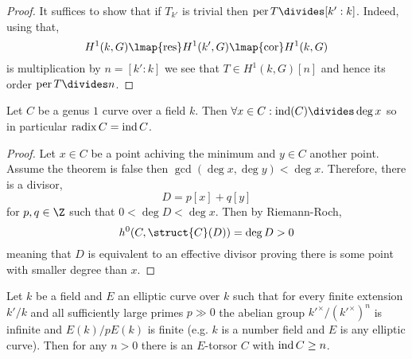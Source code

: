 \documentclass[12pt]{article}
\begin{document}
\begin{proof}
It suffices to show that if $T_{k'}$ is trivial then $\per{T} \divides [k' : k]$. Indeed, using that,
\[ H^1(k, G) \lmap{\mathrm{res}} H^1(k', G) \lmap{\mathrm{cor}} H^1(k, G) \]
is multiplication by $n = [k' : k]$ we see that $T \in H^1(k, G)[n]$ and hence its order $\per{T} \divides n$.
\end{proof}

\begin{prop}
Let $C$ be a genus $1$ curve over a field $k$. Then $\forall x \in C : \ind(C) \divides \deg{x}$ so in particular $\operatorname{radix}{C} = \operatorname{ind}{C}$.
\end{prop}

\begin{proof}
Let $x \in C$ be a point achiving the minimum and $y \in C$ another point. Assume the theorem is false then $\gcd(\deg{x}, \deg{y}) < \deg{x}$. Therefore, there is a divisor,
\[ D = p [x] + q [y] \]
for $p,q \in \Z$ such that $0 < \deg{D} < \deg{x}$. Then by Riemann-Roch,
\[ h^0(C, \struct{C}(D)) = \deg{D} > 0 \]
meaning that $D$ is equivalent to an effective divisor proving there is some point with smaller degree than $x$. 
\end{proof}

\begin{prop}
Let $k$ be a field and $E$ an elliptic curve over $k$ such that for every finite extension $k'/k$ and all sufficiently large primes $p \gg 0$ the abelian group $k'^\times / (k'^\times)^n$ is infinite and $E(k) / p E(k)$ is finite (e.g. $k$ is a number field and $E$ is any elliptic curve). Then for any $n > 0$ there is an $E$-torsor $C$ with $\operatorname{ind}{C} \ge n$.
\end{prop}
\end{document}
